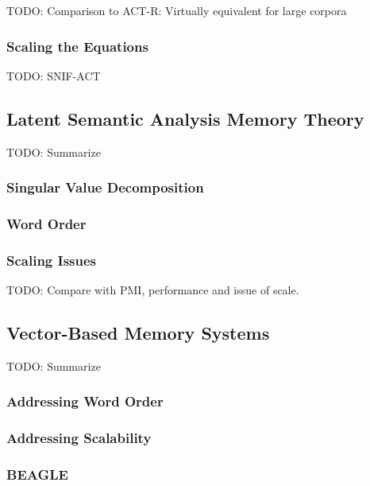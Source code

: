 \documentclass[man]{apa6}
\begin{document}
TODO: Comparison to ACT-R: Virtually equivalent for large corpora \cite{Farahat2004}

\subsubsection{Scaling the Equations}

\cite{Douglass2010}

TODO: SNIF-ACT \cite{Fu2007} \cite{Pirolli2003}

\subsection{Latent Semantic Analysis Memory Theory}

TODO: Summarize \cite{Landauer1997}

\subsubsection{Singular Value Decomposition}

\subsubsection{Word Order}

\subsubsection{Scaling Issues}

TODO: Compare with PMI, performance and issue of scale. \cite{Budiu2007}

\subsection{Vector-Based Memory Systems}

TODO: Summarize \cite{Plate1995}

\subsubsection{Addressing Word Order}

\subsubsection{Addressing Scalability}

\subsubsection{BEAGLE}
\end{document}
